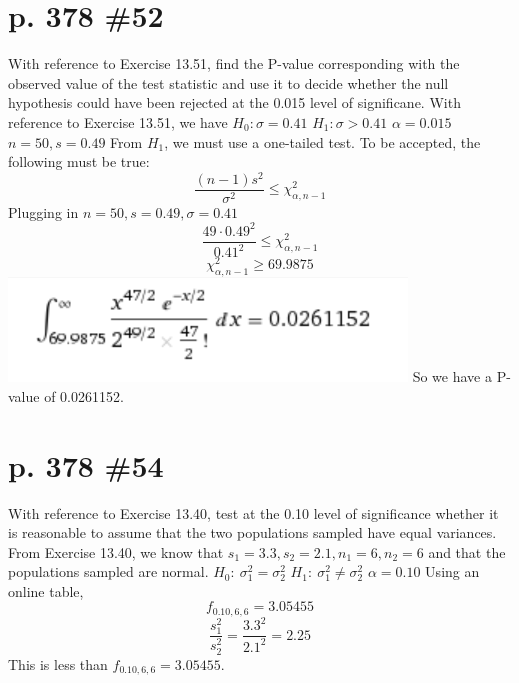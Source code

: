 \documentclass[12pt]{article}
\begin{document}
	\section[20pt]{p. 378 \#52}
	With reference to Exercise 13.51, find the P-value corresponding with the observed value of the test statistic and use it to decide whether the null hypothesis could have been rejected at the 0.015 level of significane.
	\newline \newline
	With reference to Exercise 13.51, we have
	\newline
	\(H_0: \sigma = 0.41\)
	\newline
	\(H_1: \sigma > 0.41\)
	\newline
	\(\alpha = 0.015\)
	\newline
	\(n = 50, s = 0.49\)
	\newline \newline
	From \(H_1\), we must use a one-tailed test. To be accepted, the following must be true:
	\[\frac{(n-1)s^2}{\sigma^2} \leq \chi^2_{\alpha, n-1}\]
	Plugging in \(n=50, s = 0.49, \sigma = 0.41\)
	\[\frac{49\cdot 0.49^2}{0.41^2} \leq \chi^2_{\alpha, n-1}\]
	\[\chi^2_{\alpha, n-1} \geq 69.9875\]
	\includegraphics{spicy integral 3}
	\newline
	So we have a P-value of 0.0261152.
	\newline \newline
	\newpage
	\section[20pt]{p. 378 \#54}
	With reference to Exercise 13.40, test at the 0.10 level of significance whether it is reasonable to assume that the two populations sampled have equal variances.
	\newline \newline
	From Exercise 13.40, we know that \(s_1 = 3.3, s_2 = 2.1, n_1 = 6, n_2 = 6\) and that the populations sampled are normal.
	\newline \newline
	\(H_0:\ \sigma^2_1 = \sigma^2_2\)
	\newline
	\(H_1:\ \sigma^2_1 \neq \sigma^2_2\)
	\newline
	\(\alpha = 0.10\)
	\newline \newline
	Using an online table,
	\[f_{0.10, 6,6} = 3.05455\]
	\[\frac{s_1^2}{s_2^2} = \frac{3.3^2}{2.1^2} = 2.25\]
	This is less than \(f_{0.10, 6,6} = 3.05455\).
	\newline
	\newpage
\end{document}
